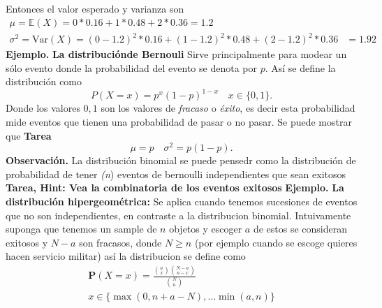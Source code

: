 \documentclass[letterpaper]{article}
\newcommand{\prob}{\textbf{P}}
\newcommand{\esp}{\mathbb E}
\newcommand{\eje}{{\newline \noindent \sc \textbf{Ejemplo. }}}
\newcommand{\obs}{{\newline \noindent \sc \textbf{Observación. }}}
\begin{document}
Entonces el valor esperado y varianza son
\begin{align*}
    \mu=\esp(X)= 0*0.16+1*0.48+2*0.36=1.2\\
    \sigma^2=\mathrm{Var}(X)=(0-1.2)^2*0.16+(1-1.2)^2*0.48+(2-1.2)^2*0.36&=1.92
\end{align*}
\eje \textbf{La distribuciónde Bernouli} Sirve principalmente para modear un sólo evento donde la probabilidad del evento se denota por \(p\). Así se define la distribución como
\[
    P(X=x)=p^{x}(1-p)^{1-x}\quad x\in\{0,1\}.
\]
\noindent Donde los valores \(0,1\) son los valores de \emph{fracaso} o \emph{éxito}, es decir esta probabilidad mide eventos que tienen una probabilidad de pasar o no pasar. Se puede mostrar que \textbf{Tarea}
\[
    \mu=p\quad\sigma^2=p(1-p).
\]
\obs La distribución binomial se puede pensedr como la distribución de probabilidad de tener \emph{(n}) eventos de bernoulli independientes que sean exitosos \textbf{Tarea, Hint: Vea la combinatoria de los eventos exitosos}
\eje \textbf{La distribución hipergeométrica:} Se aplica cuando tenemos sucesiones de eventos que no son independientes, en contraste a la distribucion binomial. Intuivamente suponga que tenemos un sample de \(n\) objetos y escoger \(a\) de estos se consideran exitosos y \(N-a\) son fracasos, donde \(N \geq n\) (por ejemplo cuando se escoge quieres hacen servicio militar) así la distribucion se define como
\begin{align*}
\prob(X=x)=\frac{{a\choose x}{N-a\choose n-x}}{{N\choose n}}\\
x\in\{\max(0,n+a-N),\dots\min(a,n)\}
\end{align*}
\end{document}
